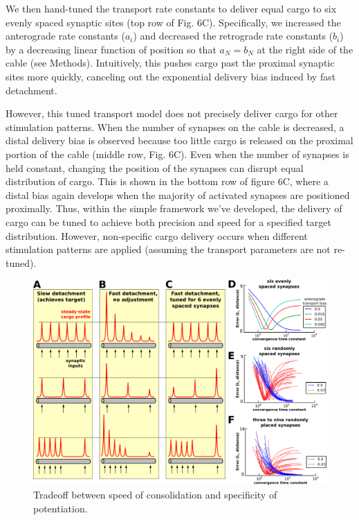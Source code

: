 \documentclass[10pt]{wlpeerj}
\begin{document}
We then hand-tuned the transport rate constants to deliver equal cargo to six evenly spaced synaptic sites (top row of Fig. 6C). Specifically, we increased the anterograde rate constants ($a_i$) and decreased the retrograde rate constants ($b_i$) by a decreasing linear function of position so that $a_N = b_N$ at the right side of the cable (see Methods). Intuitively, this pushes cargo past the proximal synaptic sites more quickly, canceling out the exponential delivery bias induced by fast detachment.

However, this tuned transport model does not precisely deliver cargo for other stimulation patterns. When the number of synapses on the cable is decreased, a distal delivery bias is observed because too little cargo is released on the proximal portion of the cable (middle row, Fig. 6C). Even when the number of synapses is held constant, changing the position of the synapses can disrupt equal distribution of cargo. This is shown in the bottom row of figure 6C, where a distal bias again develops when the majority of activated synapses are positioned proximally. Thus, within the simple framework we've developed, the delivery of cargo can be tuned to achieve both precision and speed for a specified target distribution. However, non-specific cargo delivery occurs when different stimulation patterns are applied (assuming the transport parameters are not re-tuned).

\begin{figure}[!htbp]
\begin{center}
\includegraphics[width=0.9\columnwidth]{06_heterosynaptic_cable.png}
\caption{Tradeoff between speed of consolidation and specificity of potentiation.}
\end{center}
\end{figure}
\end{document}
